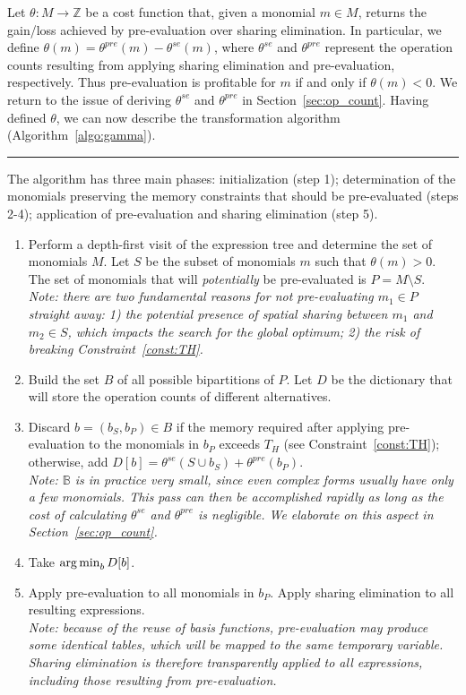 Let $\theta : M \rightarrow \mathbb{Z}$ be a cost function that, given a monomial $m \in M$, returns the gain/loss achieved by pre-evaluation over sharing elimination. In particular, we define $\theta(m) = \theta^{pre}(m) - \theta^{se}(m)$, where $\theta^{se}$ and $\theta^{pre}$ represent the operation counts resulting from applying sharing elimination and pre-evaluation, respectively. Thus pre-evaluation is profitable for $m$ if and only if $\theta(m) < 0$. We return to the issue of deriving $\theta^{se}$ and $\theta^{pre}$ in Section~\ref{sec:op_count}. Having defined $\theta$, we can now describe the transformation algorithm (Algorithm~\ref{algo:gamma}).

\noindent\rule[0.01ex]{\linewidth}{0.7pt}

\begin{Algo}
\label{algo:gamma}
\normalfont
The algorithm has three main phases: initialization (step 1); determination of the monomials preserving the memory constraints that should be pre-evaluated (steps 2-4); application of pre-evaluation and sharing elimination (step 5).
\begin{enumerate}
\item Perform a depth-first visit of the expression tree and determine the set of monomials $M$. Let $S$ be the subset of monomials $m$ such that $\theta(m) > 0$. The set of monomials that will \textit{potentially} be pre-evaluated is $P = M \setminus S$. \\ \textit{Note: there are two fundamental reasons for not pre-evaluating $m_1 \in P$ straight away: 1) the potential presence of spatial sharing between $m_1$ and $m_2 \in S$, which impacts the search for the global optimum; 2) the risk of breaking Constraint~\ref{const:TH}.}
\item Build the set $B$ of all possible bipartitions of $P$. Let $D$ be the dictionary that will store the operation counts of different alternatives.
\item Discard $b = (b_S, b_P) \in B$ if the memory required after applying pre-evaluation to the monomials in $b_P$ exceeds $T_H$ (see Constraint~\ref{const:TH}); otherwise, add $D[b] = \theta^{se}(S \cup b_S) + \theta^{pre}(b_P)$. \\ \textit{Note: $\mathbb{B}$ is in practice very small, since even complex forms usually have only a few monomials. This pass can then be accomplished rapidly as long as the cost of calculating $\theta^{se}$ and $\theta^{pre}$ is negligible. We elaborate on this aspect in Section~\ref{sec:op_count}.}
\item Take $\operatorname*{arg\,min}_b D[b]$.
\item Apply pre-evaluation to all monomials in $b_P$. Apply sharing elimination to all resulting expressions. \\ \textit{Note: because of the reuse of basis functions, pre-evaluation may produce some identical tables, which will be mapped to the same temporary variable. Sharing elimination is therefore transparently applied to all expressions, including those resulting from pre-evaluation.}
\end{enumerate}
\end{Algo}

